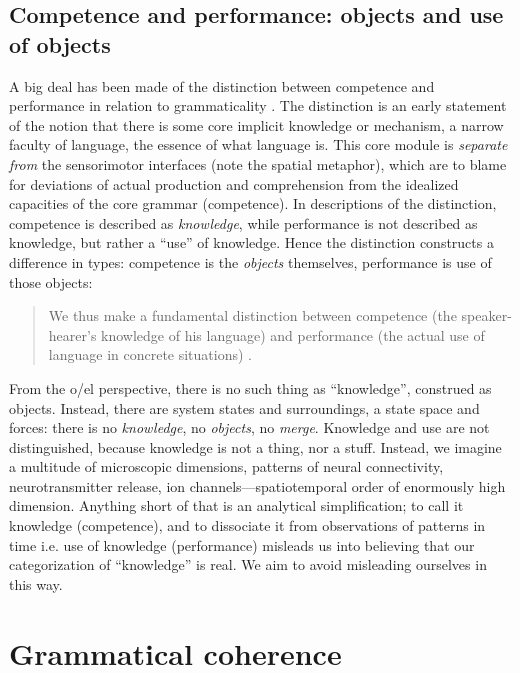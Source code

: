 \subsection{Competence and performance: objects and use of objects}

A big deal has been made of the distinction between competence and performance in relation to grammaticality \citep{Chomsky1965}. The distinction is an early statement of the notion that there is some core implicit knowledge or mechanism, a narrow faculty of language, the essence of what language is. This core module is \textit{separate from} the sensorimotor interfaces (note the spatial metaphor), which are to blame for deviations of actual production and comprehension from the idealized capacities of the core grammar (competence). In descriptions of the distinction, competence is described as \textit{knowledge}, while performance is not described as knowledge, but rather a “use” of knowledge. Hence the distinction constructs a difference in types: competence is the \textit{objects} themselves, performance is use of those objects:

\begin{quote}
We thus make a fundamental distinction between competence (the speaker-hearer's knowledge of his language) and performance (the actual use of language in concrete situations) \citep[4]{Chomsky1965}.
\end{quote}


  From the o/el perspective, there is no such thing as “knowledge”, construed as objects. Instead, there are system states and surroundings, a state space and forces: there is no \textit{knowledge}, no \textit{objects}, no \textit{merge}. Knowledge and use are not distinguished, because knowledge is not a thing, nor a stuff. Instead, we imagine a multitude of microscopic dimensions, patterns of neural connectivity, neurotransmitter release, ion channels—spatiotemporal order of enormously high dimension. Anything short of that is an analytical simplification; to call it knowledge (competence), and to dissociate it from observations of patterns in time i.e. use of knowledge (performance) misleads us into believing that our categorization of “knowledge” is real. We aim to avoid misleading ourselves in this way.

\section{Grammatical coherence}

